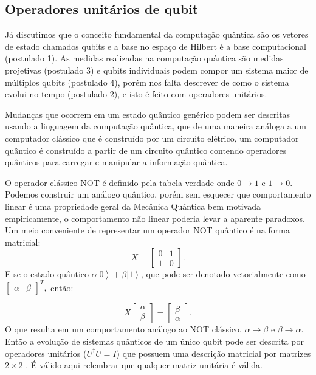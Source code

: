 \subsection{Operadores unitários de qubit }
Já discutimos que o conceito fundamental da computação quântica são os vetores de estado chamados qubits e a base no espaço de Hilbert é  a  base computacional (postulado 1).  As medidas realizadas na computação quântica são medidas projetivas (postulado 3) e qubits individuais podem compor um sistema maior de múltiplos qubits  (postulado 4), porém nos falta descrever de como o sistema evolui no tempo (postulado 2), e isto é feito com operadores unitários.

Mudanças que ocorrem em um estado quântico genérico podem ser descritas usando a linguagem da computação quântica, que de uma maneira análoga a um computador clássico que é construído por um circuito elétrico, um computador quântico é construído a partir de um circuito quântico contendo operadores quânticos  para carregar e manipular a informação quântica. 

O operador clássico NOT é definido pela tabela verdade onde $0\rightarrow 1$ e $1\rightarrow 0$. Podemos construir um análogo quântico, porém sem esquecer que comportamento linear é uma propriedade geral da Mecânica Quântica bem motivada empiricamente, o comportamento não linear poderia levar a aparente paradoxos. Um meio conveniente de representar um operador NOT quântico é na forma matricial:
\begin{equation}
X\equiv\left[\begin{array}{cc}
0 & 1\\
1 & 0
\end{array}\right]
. \end{equation}
E se o estado quântico $\alpha\left|0\right\rangle +\beta\left|1\right\rangle $, que pode ser denotado vetorialmente como $\left[\begin{array}{cc}
\alpha & \beta\end{array}\right]^{T},$  então:

\begin{equation}
X\left[\begin{array}{c}
\alpha\\
\beta
\end{array}\right]=\left[\begin{array}{c}
\beta\\
\alpha
\end{array}\right]
. \end{equation}
O que resulta em um comportamento análogo ao NOT clássico, $\alpha \rightarrow \beta$  e $\beta \rightarrow \alpha$. Então a evolução de sistemas quânticos de um único qubit pode ser descrita por operadores unitários ($U^{\dagger}U=I$)  que possuem uma descrição matricial por matrizes $2\times2$ . É válido aqui relembrar que  qualquer matriz unitária é válida. 

